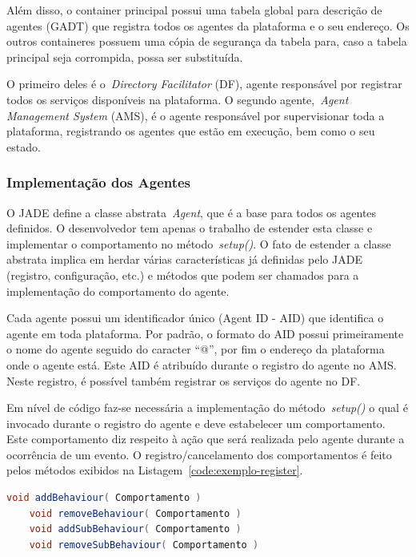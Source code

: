 Além disso, o container principal possui uma tabela global para descrição de agentes (GADT) que registra todos os agentes da plataforma e o seu endereço. Os outros containeres possuem uma cópia de segurança da tabela para, caso a tabela principal seja corrompida, possa ser substituída.

O primeiro deles é o~\emph{Directory Facilitator} (DF), agente responsável por registrar todos os serviços disponíveis na plataforma. O segundo agente,~\emph{Agent Management System} (AMS), é o agente responsável por supervisionar toda a plataforma, registrando os agentes que estão em execução, bem como o seu estado. 

\subsubsection{Implementação dos Agentes}
O JADE define a classe abstrata~\emph{Agent}, que é a base para todos os agentes definidos. O desenvolvedor tem apenas o trabalho de estender esta classe e implementar o comportamento no método~\emph{setup()}. O fato de estender a classe abstrata implica em herdar várias características já definidas pelo JADE (registro, configuração, etc.) e métodos que podem ser chamados para a implementação do comportamento do agente.

Cada agente possui um identificador único (Agent ID - AID) que identifica o agente em toda plataforma. Por padrão, o formato do AID possui primeiramente o nome do agente seguido do caracter ``@'', por fim o endereço da plataforma onde o agente está. Este AID é atribuído durante o registro do agente no AMS. Neste registro, é possível também registrar os serviços do agente no DF.

Em nível de código faz-se necessária a implementação do método~\emph{setup()} o qual é invocado durante o registro do agente e deve estabelecer um comportamento. Este comportamento diz respeito à ação que será realizada pelo agente durante a ocorrência de um evento. O registro/cancelamento dos comportamentos é feito pelos métodos exibidos na Listagem~\ref{code:exemplo-register}.

\begin{lstlisting}[language=java,label=code:exemplo-register,caption=Exemplo de registro de comportamento nos agentes.]
	void addBehaviour( Comportamento )
	void removeBehaviour( Comportamento )
	void addSubBehaviour( Comportamento )
	void removeSubBehaviour( Comportamento )
\end{lstlisting}

